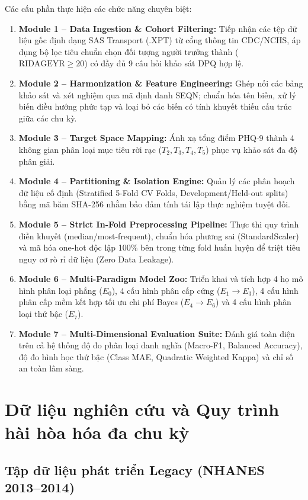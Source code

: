 Các cấu phần thực hiện các chức năng chuyên biệt:
\begin{enumerate}
    \item \textbf{Module 1 -- Data Ingestion \& Cohort Filtering:} Tiếp nhận các tệp dữ liệu gốc định dạng SAS Transport (.XPT) từ cổng thông tin CDC/NCHS, áp dụng bộ lọc tiêu chuẩn chọn đối tượng người trưởng thành ($\text{RIDAGEYR} \ge 20$) có đầy đủ 9 câu hỏi khảo sát DPQ hợp lệ.
    \item \textbf{Module 2 -- Harmonization \& Feature Engineering:} Ghép nối các bảng khảo sát và xét nghiệm qua mã định danh SEQN; chuẩn hóa tên biến, xử lý biến điều hướng phức tạp và loại bỏ các biến có tính khuyết thiếu cấu trúc giữa các chu kỳ.
    \item \textbf{Module 3 -- Target Space Mapping:} Ánh xạ tổng điểm PHQ-9 thành 4 không gian phân loại mục tiêu rời rạc ($T_2, T_3, T_4, T_5$) phục vụ khảo sát đa độ phân giải.
    \item \textbf{Module 4 -- Partitioning \& Isolation Engine:} Quản lý các phân hoạch dữ liệu cố định (Stratified 5-Fold CV Folds, Development/Held-out splits) bằng mã băm SHA-256 nhằm bảo đảm tính tái lập thực nghiệm tuyệt đối.
    \item \textbf{Module 5 -- Strict In-Fold Preprocessing Pipeline:} Thực thi quy trình điền khuyết (median/most-frequent), chuẩn hóa phương sai (StandardScaler) và mã hóa one-hot độc lập 100\% bên trong từng fold huấn luyện để triệt tiêu nguy cơ rò rỉ dữ liệu (Zero Data Leakage).
    \item \textbf{Module 6 -- Multi-Paradigm Model Zoo:} Triển khai và tích hợp 4 họ mô hình phân loại phẳng ($E_0$), 4 cấu hình phân cấp cứng ($E_1 \to E_3$), 4 cấu hình phân cấp mềm kết hợp tối ưu chi phí Bayes ($E_4 \to E_6$) và 4 cấu hình phân loại thứ bậc ($E_7$).
    \item \textbf{Module 7 -- Multi-Dimensional Evaluation Suite:} Đánh giá toàn diện trên cả hệ thống độ đo phân loại danh nghĩa (Macro-F1, Balanced Accuracy), độ đo hình học thứ bậc (Class MAE, Quadratic Weighted Kappa) và chỉ số an toàn lâm sàng.
\end{enumerate}

\section{Dữ liệu nghiên cứu và Quy trình hài hòa hóa đa chu kỳ}
\label{sec:du-lieu-nghien-cuu}

\subsection{Tập dữ liệu phát triển Legacy (NHANES 2013--2014)}
\label{subsec:legacy-cohort}

